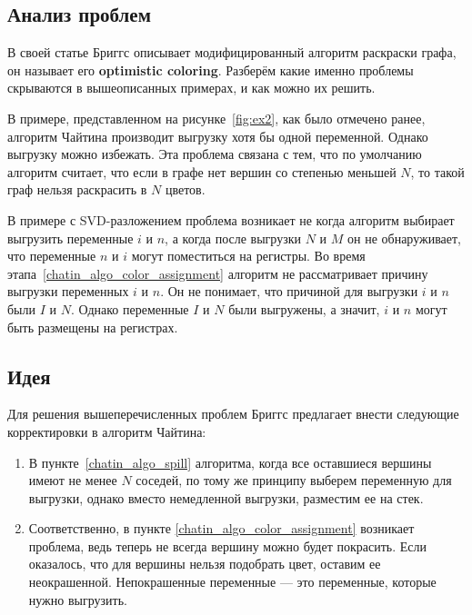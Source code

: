 \subsection{Анализ проблем}

В своей статье Бриггс описывает модифицированный алгоритм раскраски графа, он называет его \textbf{optimistic coloring}.
Разберём какие именно проблемы скрываются в вышеописанных примерах, и как можно их решить.

В примере, представленном на рисунке~\ref{fig:ex2}, как было отмечено ранее, алгоритм Чайтина производит выгрузку хотя бы одной переменной.
Однако выгрузку можно избежать.
Эта проблема связана с тем, что по умолчанию алгоритм считает, что если в графе нет вершин со степенью меньшей $N$,
то такой граф нельзя раскрасить в $N$ цветов.


В примере с SVD-разложением проблема возникает не когда алгоритм выбирает выгрузить переменные $i$ и $n$, а когда
после выгрузки $N$ и $M$ он не обнаруживает, что переменные $n$ и $i$ могут поместиться на регистры.
Во время этапа~\ref{chatin_algo_color_assignment} алгоритм не рассматривает причину выгрузки
переменных $i$ и $n$.
Он не понимает, что причиной для выгрузки $i$ и $n$ были $I$ и $N$.
Однако переменные $I$ и $N$ были выгружены,
а значит, $i$ и $n$ могут быть размещены на регистрах.

\subsection{Идея}

Для решения вышеперечисленных проблем Бриггс предлагает внести следующие корректировки в алгоритм Чайтина:

\begin{enumerate}
    \item В пункте~\ref{chatin_algo_spill} алгоритма, когда все оставшиеся вершины имеют не менее $N$ соседей,
    по тому же принципу выберем переменную для выгрузки, однако вместо немедленной выгрузки, разместим ее на стек. \label{briggs_change_spill}

    \item Соответственно, в пункте \ref{chatin_algo_color_assignment} возникает проблема, ведь теперь не всегда
    вершину можно будет покрасить.
    Если оказалось, что для вершины нельзя подобрать цвет, оставим ее неокрашенной.
    Непокрашенные переменные --- это переменные, которые нужно выгрузить.
    
\end{enumerate}

